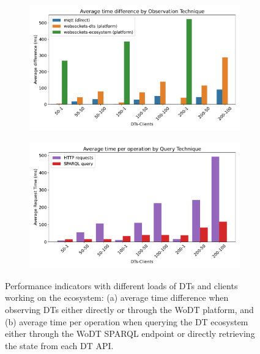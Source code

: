 \begin{figure}
    \centering
    \begin{subfigure}[t]{0.49\textwidth}
        \centering
        \includegraphics[width=\textwidth]{figures/hwodt/mean_latency_barplot.pdf}
        \label{fig:observation-delay}
    \end{subfigure}
    \hfill
    \begin{subfigure}[t]{0.49\textwidth}
        \centering
        \includegraphics[width=\textwidth]{figures/hwodt/mean_request_time_barplot.pdf}
        \label{fig:query-time}
    \end{subfigure}
    \caption{Performance indicators with different loads of \acp{DT} and clients working on the ecosystem: (a) average time difference when observing \acp{DT} either directly or through the \ac{WoDT} platform, and (b) average time per operation when querying the DT ecosystem either through the \ac{WoDT} SPARQL endpoint or directly retrieving the state from each \ac{DT} API.}
    \label{fig:sequence-interactions}
\end{figure}

